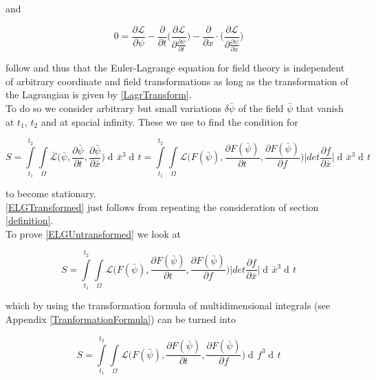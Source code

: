 \documentclass{article}
\DeclareMathOperator{\dd}{d\!}
\begin{document}
and

\begin{equation} \label{ELGUntransformed}
0 = \frac{\partial \mathcal{L}}{\partial \psi}
-\frac{\partial}{\partial t} \bigg( \frac{\partial \mathcal{L}}{\partial \frac{\partial \psi}{\partial t}} \bigg) 
-\frac{\partial}{\partial x} \cdot \bigg( \frac{\partial \mathcal{L}}{\partial \frac{\partial \psi}{\partial x}} \bigg) 
\end{equation}

follow and thus that the Euler-Lagrange equation for field theory is independent of arbitrary coordinate and field transformations as long as the transformation of the Lagrangian is given by \ref{LagrTransform}. \\

To do so we consider arbitrary but small variations $\delta \bar{\psi}$ of the field $\bar{\psi}$ that vanish at $t_1$, $t_2$ and at spacial infinity. These we use to find the condition for  

\begin{equation}
S = \int\limits_{t_1}^{t_2} \int\limits_{\Omega} \bar{\mathcal{L}}\bigg(\bar{\psi}, \frac{\partial \bar{\psi}}{\partial t}, \frac{\partial \bar{\psi}}{\partial \bar{x}}\bigg) \dd \bar{x}^3 \dd t 
= \int\limits_{t_1}^{t_2} \int\limits_{\Omega} \mathcal{L}\bigg(F(\bar{\psi}), \frac{\partial F(\bar{\psi})}{\partial t}, \frac{\partial F(\bar{\psi})}{\partial f}\bigg) 
\bigg| det \frac{\partial f}{\partial \bar{x}} \bigg| \dd \bar{x}^3 \dd t 
\end{equation}

to become stationary. \\

\ref{ELGTransformed} just follows from repeating the consideration of section \ref{definition}. \\

To prove \ref{ELGUntransformed} we look at 

\begin{equation}
S = \int\limits_{t_1}^{t_2} \int\limits_{\Omega} \mathcal{L}\bigg(F(\bar{\psi}), \frac{\partial F(\bar{\psi})}{\partial t}, \frac{\partial F(\bar{\psi})}{\partial f}\bigg) 
\bigg| det \frac{\partial f}{\partial \bar{x}} \bigg| \dd \bar{x}^3 \dd t 
\end{equation}

which by using the transformation formula of multidimensional integrals (see Appendix \ref{TranformationFormula}) can be turned into

\begin{equation}
S = \int\limits_{t_1}^{t_2} \int\limits_{\Omega} \mathcal{L}\bigg(F(\bar{\psi}), \frac{\partial F(\bar{\psi})}{\partial t}, \frac{\partial F(\bar{\psi})}{\partial f}\bigg) 
\dd f^3 \dd t 
\end{equation}
\end{document}
